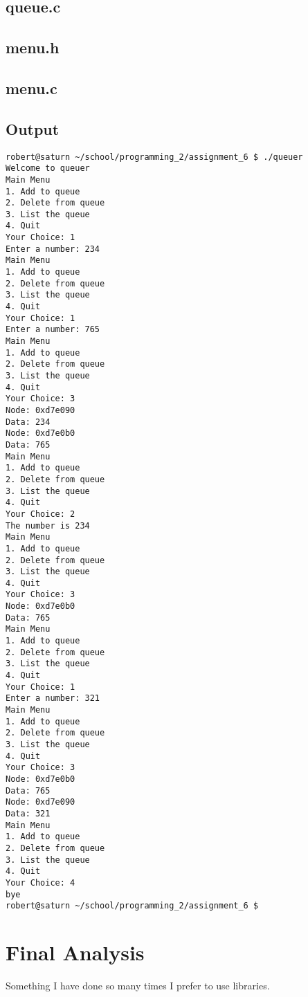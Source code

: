 \documentclass[letterpaper,oneside]{scrartcl}
\begin{document}
\subsection{queue.c}

\subsection{menu.h}

\subsection{menu.c}

\subsection{Output}
\begin{Verbatim}
robert@saturn ~/school/programming_2/assignment_6 $ ./queuer 
Welcome to queuer
Main Menu
1. Add to queue
2. Delete from queue
3. List the queue
4. Quit
Your Choice: 1
Enter a number: 234
Main Menu
1. Add to queue
2. Delete from queue
3. List the queue
4. Quit
Your Choice: 1
Enter a number: 765
Main Menu
1. Add to queue
2. Delete from queue
3. List the queue
4. Quit
Your Choice: 3
Node: 0xd7e090
Data: 234
Node: 0xd7e0b0
Data: 765
Main Menu
1. Add to queue
2. Delete from queue
3. List the queue
4. Quit
Your Choice: 2
The number is 234
Main Menu
1. Add to queue
2. Delete from queue
3. List the queue
4. Quit
Your Choice: 3
Node: 0xd7e0b0
Data: 765
Main Menu
1. Add to queue
2. Delete from queue
3. List the queue
4. Quit
Your Choice: 1
Enter a number: 321
Main Menu
1. Add to queue
2. Delete from queue
3. List the queue
4. Quit
Your Choice: 3
Node: 0xd7e0b0
Data: 765
Node: 0xd7e090
Data: 321
Main Menu
1. Add to queue
2. Delete from queue
3. List the queue
4. Quit
Your Choice: 4
bye
robert@saturn ~/school/programming_2/assignment_6 $ 
\end{Verbatim}

\section{Final Analysis}

Something I have done so many times I prefer to use libraries.
\end{document}
